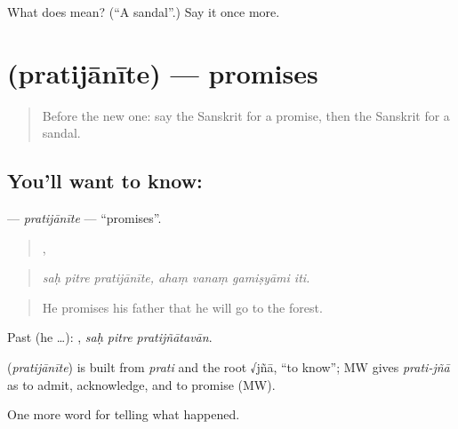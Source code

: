 \begin{tcolorbox}[breakable,colback=teal!4,colframe=teal!35!black,title={Before you move on}]
What does  mean? (\textquotedblleft{}A sandal\textquotedblright{}.) Say it once more.
\end{tcolorbox}
\section[\texorpdfstring{\sk{प्रतिजानीते} (pratijānīte)}{प्रतिजानीते (pratijānīte)}]{ (pratijānīte) — promises}

\label{lesson:SA-C337-pratijanite}



\begin{quote}
Before the new one: say the Sanskrit for a promise, then the Sanskrit for a sandal.
\end{quote}

\subsection*{You'll want to know: }
\textbf{} — \emph{pratijānīte} — \textquotedblleft{}promises\textquotedblright{}.

\begin{quote}
  ,    
\end{quote}

\begin{quote}
\emph{saḥ pitre pratijānīte, ahaṃ vanaṃ gamiṣyāmi iti.}
\end{quote}

\begin{quote}
He promises his father that he will go to the forest.
\end{quote}

Past (he …):   , \emph{saḥ pitre pratijñātavān}.

\begin{cousinweb}
\textbf{} (\emph{pratijānīte}) is built from \emph{prati} and the root √jñā, \textquotedblleft{}to know\textquotedblright{}; MW gives \emph{prati-jñā} as to admit, acknowledge, and to promise (MW).
\end{cousinweb}

\begin{grammarlens}[title={What you've built}]
One more word for telling what happened.
\end{grammarlens}

